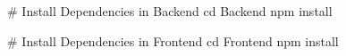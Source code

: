 # Install Dependencies in Backend
cd Backend
npm install

# Install Dependencies in Frontend
cd Frontend
npm install